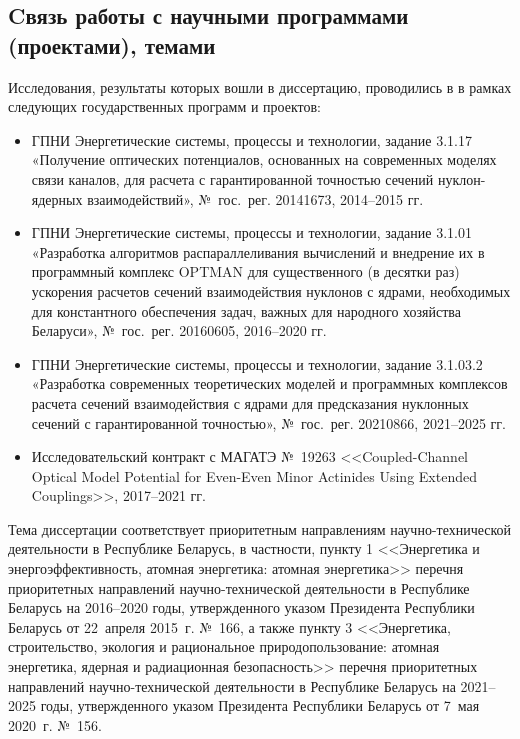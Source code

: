 

\subsection*{Cвязь работы с научными программами (проектами), темами}

Исследования, результаты которых вошли в диссертацию, проводились в {\thesisInOrganization} в рамках следующих государственных программ и проектов:

\begin{itemize}
	\item ГПНИ Энергетические системы, процессы и технологии, задание 3.1.17 «Получение оптических потенциалов, основанных на современных моделях связи каналов, для расчета с гарантированной точностью сечений нуклон-ядерных взаимодействий», №~гос.~рег. 20141673, 2014--2015 гг.
	\item ГПНИ Энергетические системы, процессы и технологии, задание 3.1.01 «Разработка алгоритмов распараллеливания вычислений и внедрение их в программный комплекс OPTMAN для существенного (в десятки раз) ускорения расчетов сечений взаимодействия нуклонов с ядрами, необходимых для константного обеспечения задач, важных для народного хозяйства Беларуси», №~гос.~рег. 20160605, 2016--2020 гг.
	\item ГПНИ Энергетические системы, процессы и технологии, задание 3.1.03.2 «Разработка современных теоретических моделей и программных комплексов расчета сечений взаимодействия с ядрами для предсказания нуклонных сечений с гарантированной точностью», №~гос.~рег. 20210866, 2021--2025 гг.
	\item Исследовательский контракт с МАГАТЭ №~19263 <<Coupled-Channel Optical Model Potential for Even-Even Minor Actinides Using Extended Couplings>>, 2017--2021 гг.
\end{itemize}

Тема диссертации соответствует приоритетным направлениям научно-технической деятельности в Республике Беларусь, в частности, пункту 1 <<Энергетика и энергоэффективность, атомная энергетика: атомная энергетика>> перечня приоритетных направлений научно-технической деятельности в Республике Беларусь на 2016--2020 годы, утвержденного указом Президента Республики Беларусь от 22~апреля 2015~г. №~166, а также пункту 3 <<Энергетика, строительство, экология и рациональное природопользование: атомная энергетика, ядерная и радиационная безопасность>> перечня приоритетных направлений научно-технической деятельности в Республике Беларусь на 2021--2025 годы, утвержденного указом Президента Республики Беларусь от 7~мая 2020~г. №~156.

